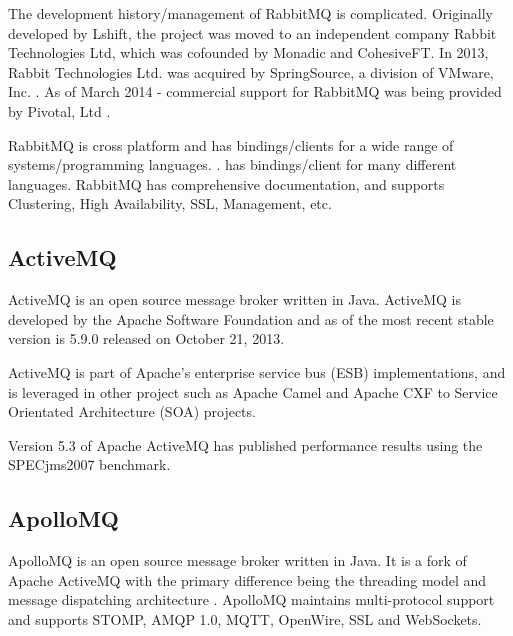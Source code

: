 \documentclass{thesis}
\begin{document}
The development history/management of RabbitMQ is complicated.  Originally developed by Lshift, the project was moved to an independent company Rabbit Technologies Ltd, which was cofounded by Monadic and CohesiveFT.  In 2013, Rabbit Technologies Ltd. was acquired by SpringSource, a division of VMware, Inc. .  As of March 2014 - commercial support for RabbitMQ was being provided by Pivotal, Ltd  .

RabbitMQ is cross platform and has bindings/clients for a wide range of systems/programming languages.  .  has bindings/client for many different languages.  RabbitMQ has comprehensive documentation, and supports Clustering, High Availability, SSL, Management, etc. 


\subsection{ActiveMQ}
ActiveMQ is an open source message broker written in Java.  ActiveMQ is developed by the Apache Software Foundation and as of  the most recent stable version is 5.9.0 released on October 21, 2013.

ActiveMQ is part of Apache's enterprise service bus (ESB) implementations, and is leveraged in other project such as Apache Camel and Apache CXF to Service Orientated Architecture (SOA) projects.

Version 5.3 of Apache ActiveMQ has published performance results using the SPECjms2007 benchmark.  


\subsection{ApolloMQ}
ApolloMQ is an open source message broker written in Java.  It is a fork of Apache ActiveMQ with the primary difference being the threading model and message dispatching architecture .  ApolloMQ maintains multi-protocol support and supports STOMP, AMQP 1.0, MQTT, OpenWire, SSL and WebSockets.
\end{document}
